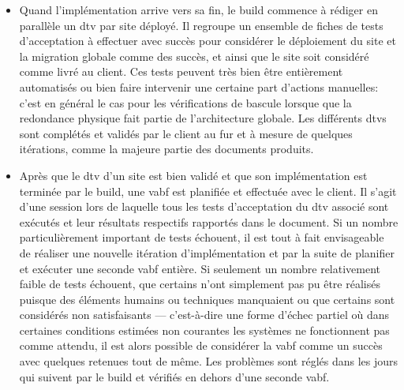 \documentclass[12pt, oneside, a4paper, titlepage]{report}
\begin{document}
\begin{itemize}
    \item Quand l'implémentation arrive vers sa fin, le \gls{build} commence à
        rédiger en parallèle un \gls{dtv} par site déployé. Il regroupe un
        ensemble de fiches de tests d'acceptation à effectuer avec succès pour
        considérer le déploiement du site et la migration globale comme des
        succès, et ainsi que le site soit considéré comme livré au client. Ces
        tests peuvent très bien être entièrement automatisés ou bien faire
        intervenir une certaine part d'actions manuelles: c'est en général le
        cas pour les vérifications de bascule lorsque que la redondance physique
        fait partie de l'architecture globale.  Les différents \glspl{dtv} sont
        complétés et validés par le client au fur et à mesure de quelques
        itérations, comme la majeure partie des documents produits.

    \item Après que le \gls{dtv} d'un site est bien validé et que son
        implémentation est terminée par le \gls{build}, une \gls{vabf} est
        planifiée et effectuée avec le client. Il s'agit d'une session lors de
        laquelle tous les tests d'acceptation du \gls{dtv} associé sont exécutés
        et leur résultats respectifs rapportés dans le document. Si un nombre
        particulièrement important de tests échouent, il est tout à fait
        envisageable de réaliser une nouvelle itération d'implémentation et par
        la suite de planifier et exécuter une seconde \gls{vabf} entière. Si
        seulement un nombre relativement faible de tests échouent, que certains
        n'ont simplement pas pu être réalisés puisque des éléments humains ou
        techniques manquaient ou que certains sont considérés non satisfaisants
        --- c'est-à-dire une forme d'échec partiel où dans certaines conditions
        estimées non courantes les systèmes ne fonctionnent pas comme attendu,
        il est alors possible de considérer la \gls{vabf} comme un succès avec
        quelques retenues tout de même. Les problèmes sont réglés dans les jours
        qui suivent par le \gls{build} et vérifiés en dehors d'une seconde
        \gls{vabf}.


\end{itemize}
\end{document}
